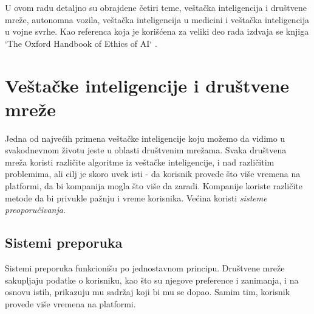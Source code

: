 \documentclass[a4paper]{article}
\newtheorem{primer}{Primer}[section]
\begin{document}
U ovom radu detaljno su obrajdene četiri teme, veštačka inteligencija i društvene mreže, autonomna vozila, veštačka inteligencija u medicini i veštačka inteligencija u vojne svrhe. Kao referenca koja je korišćena za veliki deo rada izdvaja se knjiga `The Oxford Handbook of Ethics of AI` \cite{oxford_knjiga}.




\section{Veštačke inteligencije i društvene mreže}
\label{sec:preporučivanje}

Jedna od najvećih primena veštačke inteligencije koju možemo da vidimo u svakodnevnom životu jeste u oblasti društvenim mrežama. Svaka društvena mreža koristi različite algoritme iz veštačke inteligencije, i nad različitim problemima,
ali cilj je skoro uvek isti - da korisnik provede što više vremena na platformi, da bi kompanija mogla što više da zaradi.
Kompanije koriste različite metode da bi privukle pažnju i vreme korisnika. Većina koristi \emph{sisteme preoporučivanja}.
\subsection{Sistemi preporuka}
Sistemi preporuka funkcionišu po jednostavnom principu. Društvene mreže sakupljaju podatke o korisniku, kao što su njegove preference i zanimanja, i na osnovu istih, prikazuju mu sadržaj koji bi mu se dopao. Samim tim, korisnik provede više vremena na platformi.
\end{document}
